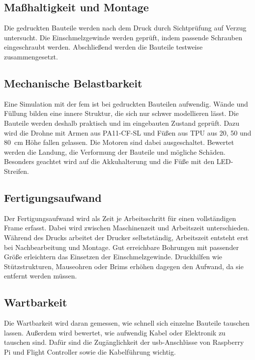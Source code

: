         \subsection{Maßhaltigkeit und Montage}
        \label{sec:Eval_Frame_Montage}

        Die gedruckten Bauteile werden nach dem Druck durch Sichtprüfung auf Verzug untersucht. Die Einschmelzgewinde werden geprüft, indem passende Schrauben eingeschraubt werden. Abschließend werden die Bauteile testweise zusammengesetzt.

        \subsection{Mechanische Belastbarkeit}
        \label{sec:Eval_Frame_Mechanik}

        Eine Simulation mit der \gls{fem} ist bei gedruckten Bauteilen aufwendig. Wände und Füllung bilden eine innere Struktur, die sich nur schwer modellieren lässt. Die Bauteile werden deshalb praktisch und im eingebauten Zustand geprüft. Dazu wird die Drohne mit Armen aus PA11-CF-SL und Füßen aus TPU aus 20, 50 und \SI{80}{\centi\metre} Höhe fallen gelassen. Die Motoren sind dabei ausgeschaltet. Bewertet werden die Landung, die Verformung der Bauteile und mögliche Schäden. Besonders geachtet wird auf die Akkuhalterung und die Füße mit den LED-Streifen. %

        \subsection{Fertigungsaufwand}
        \label{sec:Eval_Frame_Fertigung}

        Der Fertigungsaufwand wird als Zeit je Arbeitsschritt für einen vollständigen Frame erfasst. Dabei wird zwischen Maschinenzeit und Arbeitszeit unterschieden. Während des Drucks arbeitet der Drucker selbstständig, Arbeitszeit entsteht erst bei Nachbearbeitung und Montage. Gut erreichbare Bohrungen mit passender Größe erleichtern das Einsetzen der Einschmelzgewinde. Druckhilfen wie Stützstrukturen, Mauseohren oder Brims erhöhen dagegen den Aufwand, da sie entfernt werden müssen.

        \subsection{Wartbarkeit}
        \label{sec:Eval_Frame_Wartung}

        Die Wartbarkeit wird daran gemessen, wie schnell sich einzelne Bauteile tauschen lassen. Außerdem wird bewertet, wie aufwendig Kabel oder Elektronik zu tauschen sind. Dafür sind die Zugänglichkeit der \gls{usb}-Anschlüsse von Raspberry Pi und Flight Controller sowie die Kabelführung wichtig.

